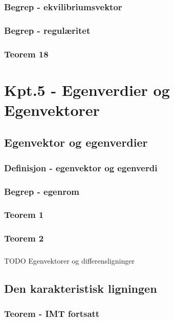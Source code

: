 \documentclass{article}
\begin{document}
      \subsubsection{Begrep - ekvilibriumsvektor}
        
      \subsubsection{Begrep - regulæritet}
        
      \subsubsection{Teorem 18}
        
  \section{Kpt.5 - Egenverdier og Egenvektorer}
    \subsection{Egenvektor og egenverdier}
      \subsubsection{Definisjon - egenvektor og egenverdi}
        
      \subsubsection{Begrep - egenrom}
        
      \subsubsection{Teorem 1}
        
      \subsubsection{Teorem 2}
        
      \subsubsection{}
        TODO Egenvektorer og differensligninger
    \subsection{Den karakteristisk ligningen}
      \subsubsection{Teorem - IMT fortsatt}
        
\end{document}
